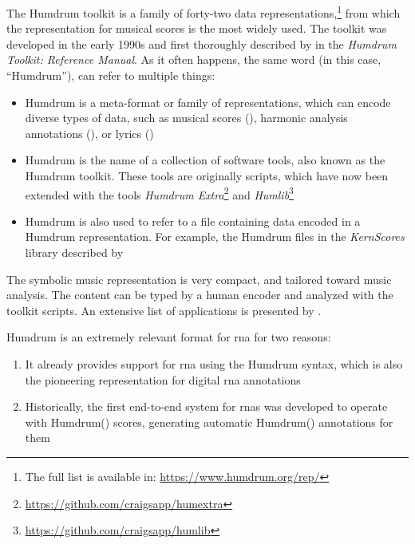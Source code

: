 


The Humdrum toolkit is a family of forty-two data
representations,\footnote{The full list is available in:
\href{https://www.humdrum.org/rep/}{https://www.humdrum.org/rep/}}
from which the  representation for musical
scores is the most widely used. The toolkit was developed in
the early 1990s and first thoroughly described by
\textcite{huron1994humdrum} in the \emph{Humdrum Toolkit:
Reference Manual}. As it often happens, the same word (in
this case, ``Humdrum''), can refer to multiple things:

\begin{itemize}
    \item Humdrum is a meta-format or family of
    representations, which can encode diverse types of data,
    such as musical scores (), harmonic
    analysis annotations (), or lyrics
    ()
    \item Humdrum is the name of a collection of software
    tools, also known as the Humdrum toolkit. These tools
    are originally  scripts, which have now been
    extended with the  tools \emph{Humdrum
    Extra}\footnote{\href{https://github.com/craigsapp/humextra}{https://github.com/craigsapp/humextra}}
    and
    \emph{Humlib}\footnote{\href{https://github.com/craigsapp/humlib}{https://github.com/craigsapp/humlib}}
    \item Humdrum is also used to refer to a file containing
    data encoded in a Humdrum representation. For example,
    the Humdrum files in the \emph{KernScores} library
    described by~\textcite{sapp2005online}
\end{itemize}


The  symbolic music representation is very
compact, and tailored toward music analysis. The content can
be typed by a human encoder and analyzed with the toolkit
scripts. An extensive list of applications is presented by
\textcite{sapp2011computational}.


Humdrum is an extremely relevant format for \gls{rna} for two reasons:

\begin{enumerate}
    \item It already provides support for \gls{rna} using the Humdrum syntax, which is also the pioneering representation for digital \gls{rna} annotations
    \item Historically, the first end-to-end system for \glspl{rna} was developed to operate with Humdrum() scores, generating automatic Humdrum() annotations for them
\end{enumerate}
